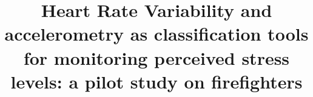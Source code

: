 \documentclass[twocolumn]{bmcart}
\date{}
\begin{document}

\begin{frontmatter}

\begin{fmbox}

\title{Heart Rate Variability and accelerometry as classification tools for monitoring perceived stress levels: a pilot study on firefighters}

\author[
   addressref={aff1},                   %
   corref={aff1},                       %
   email={michal.meina@gmail.com}   %
]{ }
\author[
   addressref={aff2},
   email={sadowska.maria88@gmail.com}
]{ }
\author[
   addressref={aff1},
   email={trufliczka@gmail.com}
]{ }
\author[
   addressref={aff3},
   email={mozgun@mat.umk.pl}
]{ }
\author[
   addressref={aff2},
   email={joanna.dreszer@gmail.com}
]{ }
\author[
   addressref={aff4},
   email={adam.p.krasuski@gmail.com}
]{ }
\author[
   addressref={aff2},
   email={bibianna.balaj@gmail.com}
]{ }


\address[id=aff1]{%
  , %
  ,                     %
  ,                                %
  ,                              %
}

\address[id=aff2]{%
  ,
  ,
  ,
  ,
}

\address[id=aff3]{%
  ,
  ,
  ,
  ,
}

\address[id=aff4]{%
  ,
  ,
  ,
  ,
}

\begin{artnotes}
\end{artnotes}


\end{fmbox}
\end{frontmatter}
\end{document}
